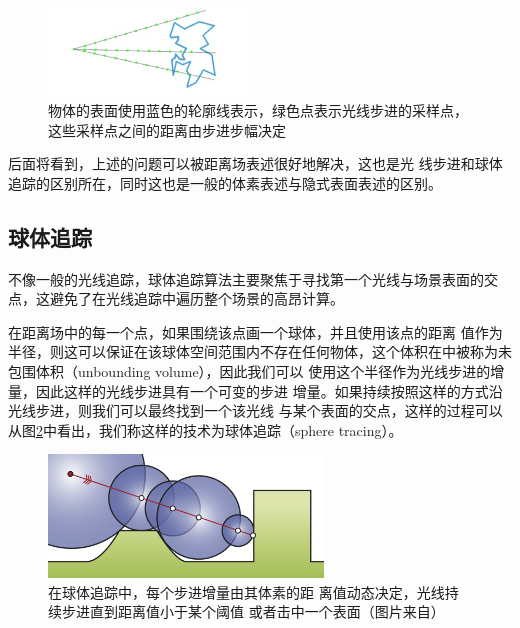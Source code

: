 \begin{figure}
	\sidecaption
	\includegraphics[width=0.47\textwidth]{figures/df/ray-marching-problems}
	\caption{物体的表面使用蓝色的轮廓线表示，绿色点表示光线步进的采样点，这些采样点之间的距离由步进步幅决定}
	\label{f:df-ray-marching-problems}
\end{figure}

后面将看到，上述的问题可以被距离场表述很好地解决，这也是光 线步进和球体追踪的区别所在，同时这也是一般的体素表述与隐式表面表述的区别。




\subsection{球体追踪}
不像一般的光线追踪，球体追踪算法主要聚焦于寻找第一个光线与场景表面的交点，这避免了在光线追踪中遍历整个场景的高昂计算。

在距离场中的每一个点，如果围绕该点画一个球体，并且使用该点的距离 值作为半径，则这可以保证在该球体空间范围内不存在任何物体，这个体积在\cite{a:Ray-Tracing-Deterministic-3-DFractals}中被称为未包围体积（unbounding volume），因此我们可以 使用这个半径作为光线步进的增量，因此这样的光线步进具有一个可变的步进 增量。如果持续按照这样的方式沿光线步进，则我们可以最终找到一个该光线 与某个表面的交点，这样的过程可以从图\ref{f:df-sphere_tracing}中看出，我们称这样的技术为球体追踪（sphere tracing）。

\begin{figure}
	\sidecaption
	\includegraphics[width=0.65\textwidth]{figures/df/sphere_tracing}
	\caption{在球体追踪中，每个步进增量由其体素的距 离值动态决定，光线持续步进直到距离值小于某个阈值 或者击中一个表面（图片来自\cite{a:Enhanced-Sphere-Tracing}）}
	\label{f:df-sphere_tracing}
\end{figure}

